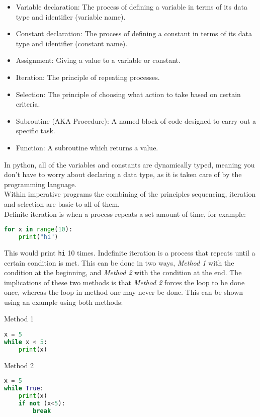 \documentclass[a4paper]{article}
\begin{document}
			\begin{itemize}
				\setlength\itemsep{0em}
				\item Variable declaration: The process of defining a variable in terms of its data type and identifier (variable name).
				\item Constant declaration: The process of defining a constant in terms of its data type and identifier (constant name).
				\item Assignment: Giving a value to a variable or constant.
				\item Iteration: The principle of repeating processes.
				\item Selection: The principle of choosing what action to take based on certain criteria.
				\item Subroutine (AKA Procedure): A named block of code designed to carry out a specific task.
				\item Function: A subroutine which returns a value.
			\end{itemize}
			In python, all of the variables and constants are dynamically typed, meaning you don't have to worry about declaring a data type, as it is taken care of by the programming language. \\
			Within imperative programs the combining of the principles sequencing, iteration and selection are basic to all of them.\\
			Definite iteration is when a process repeats a set amount of time, for example:
			\begin{lstlisting}[language=python]
for x in range(10):
	print("hi")\end{lstlisting}
			This would print \verb|hi| 10 times. Indefinite iteration is a process that repeats until a certain condition is met. This can be done in two ways, \textit{Method 1} with the condition at the beginning, and \textit{Method 2} with the condition at the end. The implications of these two methods is that \textit{Method 2} forces the loop to be done once, whereas the loop in method one may never be done. This can be shown using an example using both methods:
			\begin{multicols}{2}
				Method 1
				\begin{lstlisting}[language=python]
x = 5
while x < 5:
	print(x)\end{lstlisting}
				
				\columnbreak
				Method 2
				\begin{lstlisting}[language=python]
x = 5
while True:
	print(x)
	if not (x<5):
		break \end{lstlisting}
				
			\end{multicols}
\end{document}
